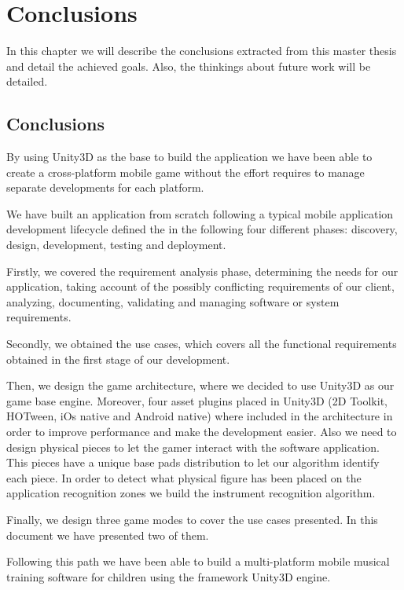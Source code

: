 \chapter{Conclusions}
\label{chap:conclusions}
\begin{chapterintro}
In this chapter we will describe the conclusions extracted from this master thesis and detail the achieved goals. Also, the thinkings about future work will be detailed.
\end{chapterintro}

\cleardoublepage
\section{Conclusions}

By using Unity3D as the base to build the application we have been able to create a cross-platform mobile game without the effort requires to manage separate developments for each platform.

We have built an application from scratch following a typical mobile application development lifecycle defined the in the following four different phases: discovery, design, development, testing and deployment.~\cite{vithani2014mod}

Firstly, we covered the requirement analysis phase, determining the needs for our application, taking account of the possibly conflicting requirements of our client, analyzing, documenting, validating and managing software or system requirements.~\cite{kotonya1998requirements}

Secondly, we obtained the use cases, which covers all the functional requirements obtained in the first stage of our development.

Then, we design the game architecture, where we decided to use Unity3D as our game base engine. Moreover, four asset plugins placed in Unity3D (2D Toolkit, HOTween, iOs native and Android native) where included in the architecture in order to improve performance and make the development easier. Also we need to design physical pieces to let the gamer interact with the software application. This pieces have a unique base pads distribution to let our algorithm identify each piece. In order to detect what physical figure has been placed on the application recognition zones we build the instrument recognition algorithm.

Finally, we design three game modes to cover the use cases presented. In this document we have presented two of them.

Following this path we have been able to build a multi-platform mobile musical training software for children using the framework Unity3D engine.

